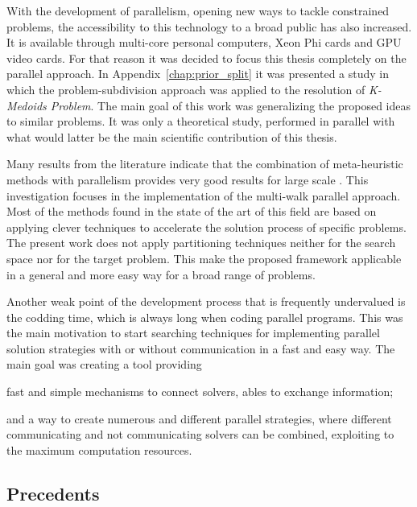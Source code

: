 With the development of parallelism, opening new ways to tackle constrained problems, the accessibility to this technology to a broad public has also increased. It is available through multi-core personal computers, Xeon Phi cards and GPU video cards. For that reason it was decided to focus this thesis completely on the parallel approach. In Appendix~\ref{chap:prior_split} it was presented a study in which the problem-subdivision approach was applied to the resolution of {\it K-Medoids Problem}. The main goal of this work was generalizing the proposed ideas to similar problems. It was only a theoretical study, performed in parallel with what would latter be the main scientific contribution of this thesis.

Many results from the literature indicate that the combination of meta-heuristic methods with parallelism provides very good results for large scale \csps. This investigation focuses in the implementation of the multi-walk parallel approach. Most of the methods found in the state of the art of this field are based on applying clever techniques to accelerate the solution process of specific problems. The present work does not apply partitioning techniques neither for the search space nor for the target problem. This make the proposed framework applicable in a general and more easy way for a broad range of problems.

Another weak point of the development process that is frequently undervalued is the codding time, which is always long when coding parallel programs. This was the main motivation to start searching techniques for implementing parallel solution strategies with or without communication in a fast and easy way. The main goal was creating a tool providing 
\begin{inparaenum}[1-]
\item fast and simple mechanisms to connect solvers, ables to exchange information; 
\item and a way to create numerous and different parallel strategies, where different communicating and not communicating solvers can be combined, exploiting to the maximum computation resources.
\end{inparaenum}

\subsection{Precedents}

